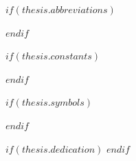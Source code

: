 \setlength{\cftsecindent}{0.5em}        %
\setlength{\cftsubsecindent}{1em}       %
\setlength{\cftsubsubsecindent}{1.5em}  %
\renewcommand{\cftfigpresnum}{Figure~}
\renewcommand{\cfttabpresnum}{Table~}
\renewcommand{\cftfigaftersnum}{:~}  %
\renewcommand{\cfttabaftersnum}{:~}  %
\setlength{\cftbeforefigskip}{0.5em}  %
\setlength{\cftbeforetabskip}{0.5em} %
\setlength{\cftfignumwidth}{5em} %
\setlength{\cfttabnumwidth}{5em} %
\setlength{\cftfigindent}{0em}    %
\setlength{\cfttabindent}{0em}    %
\startonrightwithgap
\begingroup
\hypersetup{linkcolor=$if(toclinkcolor)$$toclinkcolor$$else$black$endif$}
\startonrightwithgap
\tableofcontents  
\startonrightwithgap
\listoffigures
\startonrightwithgap
\listoftables 
\endgroup

$if(thesis.abbreviations)$
  \startonrightwithgap
  
$endif$

$if(thesis.constants)$
  \startonrightwithgap
  
$endif$

$if(thesis.symbols)$
  \startonrightwithgap
  
$endif$

$if(thesis.dedication)$
  \startonrightwithgap
  \dedicatory{} 
$endif$

\mainmatter %
\pagestyle{thesis}
